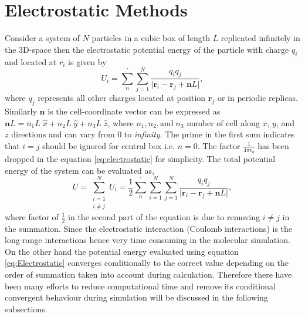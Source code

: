 \section{Electrostatic Methods}
\label{sec:ElectMethod}
Consider a system of $N$ particles in a cubic box of length $L$  replicated infinitely in the 3D-space then the electrostatic potential energy of the particle with charge $q_i$ and located at $r_i$ is given by
\begin{equation}
U_i =  \sum_n^{'}{ \sum_{j=1}^N {\frac{q_i q_j}{\lvert {\mathbf{r}_i-\mathbf{r}_j + \mathbf{n}L}\rvert}}},
\label{eq:electrostatic}
\end{equation}
where $q_j$ represents all other charges located at position $\mathbf{r}_j$ or in periodic replicas. Similarly $\mathbf{n}$ is the cell-coordinate vector can be expressed as $\mathbf{n}L = n_1 L \;\hat{x} + n_2 L\;\hat{y} + n_3 L\;\hat{z}$, where $n_1,n_2, \text{and}\; n_3$ number of cell along $x$, $y$, and $z$ directions and can vary from 0 to \textit{infinity}. The prime in the first sum indicates that $i =j $ should be ignored for central box i.e. $n = 0$. The factor $\frac{1}{4\pi\epsilon_o}$ has been dropped in the equation \ref{eq:electrostatic} for simplicity. The total potential energy of the system can be evaluated as,
\begin{equation}
U = \sum_{\substack{i=1 \\ i\neq j}}^N{U_i} = \frac{1}{2}\sum_n^{'}{\sum_{i=1}^N { \sum_{j=1}^N {\frac{q_i q_j}{\lvert {\mathbf{r}_i-\mathbf{r}_j + \mathbf{n}L}\rvert}}}},
\label{eq:totalElectrostatic}
\end{equation}
where factor of $\frac{1}{2}$ in the second part of the equation is due to removing $i \neq j$ in the summation. Since the electrostatic interaction (Coulomb interactions) is the long-range interactions hence very time consuming in the molecular simulation. On the other hand the potential energy evaluated using equation \ref{eq:Electrostatic} converges conditionally to the correct value depending on the order of summation taken into account during  calculation\cite{Allen89}. Therefore there have been many efforts to reduce computational time and remove its conditional convergent behaviour during simulation will be discussed in the following subsections.  

